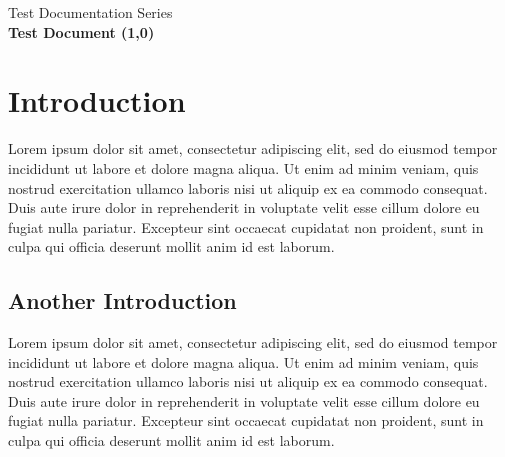 \documentclass[12pt]{article}
\begin{document}


\begin{center}
	Test Documentation Series
	\\
	\LARGE\bfseries Test Document
	\line(1,0){\textwidth}
\end{center}



\section{Introduction}
Lorem ipsum dolor sit amet, consectetur adipiscing elit, sed do eiusmod tempor incididunt ut labore et dolore magna aliqua. Ut enim ad minim veniam, quis nostrud exercitation ullamco laboris nisi ut aliquip ex ea commodo consequat. Duis aute irure dolor in reprehenderit in voluptate velit esse cillum dolore eu fugiat nulla pariatur. Excepteur sint occaecat cupidatat non proident, sunt in culpa qui officia deserunt mollit anim id est laborum.\cite{test}

\subsection{Another Introduction}
Lorem ipsum dolor sit amet, consectetur adipiscing elit, sed do eiusmod tempor incididunt ut labore et dolore magna aliqua. Ut enim ad minim veniam, quis nostrud exercitation ullamco laboris nisi ut aliquip ex ea commodo consequat. Duis aute irure dolor in reprehenderit in voluptate velit esse cillum dolore eu fugiat nulla pariatur. Excepteur sint occaecat cupidatat non proident, sunt in culpa qui officia deserunt mollit anim id est laborum.\cite{test}
\end{document}
